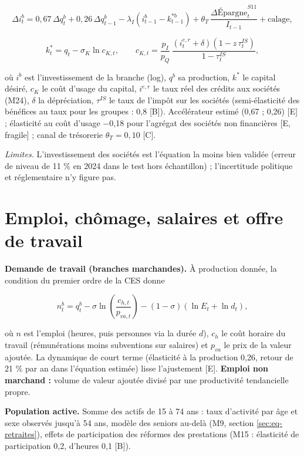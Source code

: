 \documentclass[
  11pt,
  11pt,
  a4paper,
  openany]{book}
\begin{document}
\[\Delta i^b_{t} = 0{,}67\,\Delta q^b_{t} + 0{,}26\,\Delta q^b_{t-1} - \lambda_I\left(i^b_{t-1} - k^{*b}_{t-1}\right) + \theta_T\,\frac{\Delta \text{Épargne}^{S11}_{t}}{I_{t-1}} + \text{calage},\]

\[k^{*}_t = q_t - \sigma_K \ln c_{K,t}, \qquad c_{K,t} = \frac{p_I}{p_Q}\,\frac{\left(i^{e,r}_t + \delta\right)\left(1 - z\,\tau^{IS}_t\right)}{1 - \tau^{IS}_t},\]

où \(i^b\) est l'investissement de la branche (log), \(q^b\) sa
production, \(k^*\) le capital désiré, \(c_K\) le coût d'usage du
capital, \(i^{e,r}\) le taux réel des crédits aux sociétés (M24),
\(\delta\) la dépréciation, \(\tau^{IS}\) le taux de l'impôt sur les
sociétés (semi-élasticité des bénéfices au taux pour les groupes : 0,8
{[}B{]}). Accélérateur estimé (0,67 ; 0,26) {[}E{]} ; élasticité au coût
d'usage −0,18 pour l'agrégat des sociétés non financières {[}E,
fragile{]} ; canal de trésorerie \(\theta_T = 0{,}10\) {[}C{]}.

\emph{Limites.} L'investissement des sociétés est l'équation la moins
bien validée (erreur de niveau de 11 \% en 2024 dans le test hors
échantillon) ; l'incertitude politique et réglementaire n'y figure pas.

\hypertarget{sec:eq-travail}{%
\section{Emploi, chômage, salaires et offre de
travail}\label{sec:eq-travail}}

\textbf{Demande de travail (branches marchandes).} À production donnée,
la condition du premier ordre de la CES donne

\[n^b_t = q^b_t - \sigma \ln\left(\frac{c_{h,t}}{p_{va,t}}\right) - (1-\sigma)\left(\ln E_t + \ln d_t\right),\]

où \(n\) est l'emploi (heures, puis personnes via la durée \(d\)),
\(c_h\) le coût horaire du travail (rémunérations moins subventions sur
salaires) et \(p_{va}\) le prix de la valeur ajoutée. La dynamique de
court terme (élasticité à la production 0,26, retour de 21 \% par an
dans l'équation estimée) lisse l'ajustement {[}E{]}. \textbf{Emploi non
marchand :} volume de valeur ajoutée divisé par une productivité
tendancielle propre.

\textbf{Population active.} Somme des actifs de 15 à 74 ans : taux
d'activité par âge et sexe observés jusqu'à 54 ans, modèle des seniors
au-delà (M9, section \ref{sec:eq-retraites}), effets de participation
des réformes des prestations (M15 : élasticité de participation 0,2,
d'heures 0,1 {[}B{]}).
\end{document}
